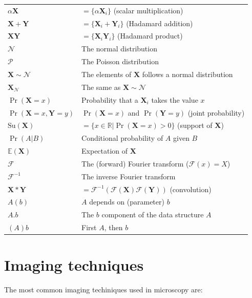\documentclass{article}
\begin{document}
\begin{tabular}{ll}
  $\alpha\mathbf{X}$ & $=\{\alpha\mathbf{X}_i\}$ (scalar multiplication) \\
  $\mathbf{X}+\mathbf{Y}$ & $=\{\mathbf{X}_i + \mathbf{Y}_i\}$ (Hadamard addition) \\ 
  $\mathbf{X}\mathbf{Y}$ & $=\{\mathbf{X}_i\mathbf{Y}_i\}$ (Hadamard product) \\ 
  $\mathcal{N}$ & The normal distribution \\ 
  $\mathcal{P}$ & The Poisson distribution \\
  $\mathbf{X}\sim\mathcal{N}$ & The elements of $\mathbf{X}$ follows a normal distribution \\
  $\mathbf{X}_{\mathcal{N}}$ & The same as $\mathbf{X}\sim\mathcal{N}$ \\
  $\Pr(\mathbf{X}=x)$ & Probability that a $\mathbf{X}_i$ takes the value $x$ \\
  $\Pr(\mathbf{X}=x, \mathbf{Y}=y)$ & $\Pr(\mathbf{X}=x)$ and $\Pr(\mathbf{Y}=y)$ (joint probability)  \\
  $\mathrm{Su}(\mathbf{X})$ & $=\{x\in\mathbb{R}|\Pr(\mathbf{X}=x)>0\}$ (support of $\mathbf{X}$)\\
  $\Pr(A|B)$ & Conditional probability of $A$ given $B$ \\
  $\mathbb{E}(\mathbf{X})$ & Expectation of $\mathbf{X}$ \\ 
  $\mathcal{F}$ & The (forward) Fourier transform ($\mathcal{F}(x)=X$) \\
  $\mathcal{F}^{-1}$ & The inverse Fourier transform \\
  $\mathbf{X}*\mathbf{Y}$ & $=\mathcal{F}^{-1}(\mathcal{F}(\mathbf{X})\mathcal{F}(\mathbf{Y}))$ (convolution) \\
  $A(b)$ & $A$ depends on (parameter) $b$ \\
  $A.b$ & The $b$ component of the data structure $A$ \\
  $(A)b$ & First $A$, then $b$ 
\end{tabular}


\section{Imaging techniques}

The most common imaging techiniques used in microscopy are:
\end{document}
